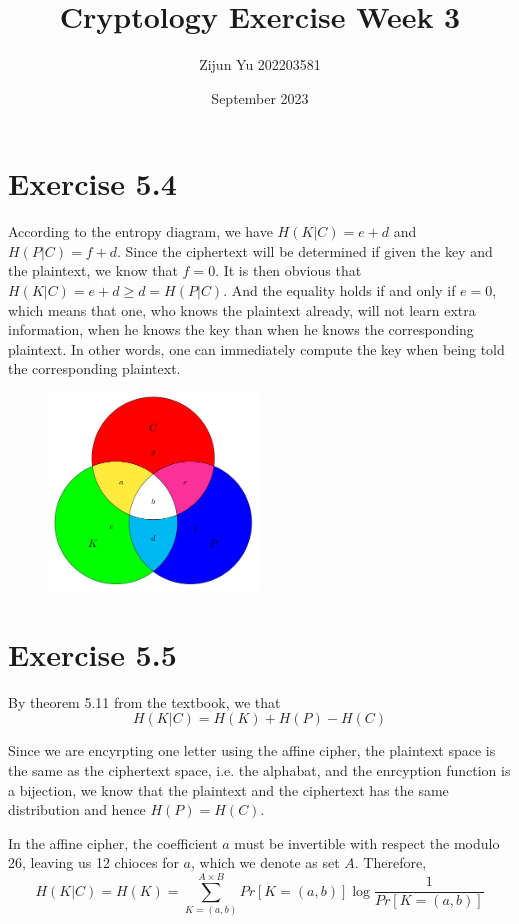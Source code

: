\documentclass{article}
\title{Cryptology Exercise Week 3}
\author{Zijun Yu 202203581}
\date{September 2023}
\begin{document}
\maketitle

\section*{Exercise 5.4}

According to the entropy diagram, we have $H(K|C) = e+d$ and
$H(P|C) = f+d$. Since the ciphertext will be determined if given
the key and the plaintext, we know that $f=0$. It is then
obvious that $H(K|C) = e+d \geq d = H(P|C)$. And the equality
holds if and only if $e=0$, which means that one,
who knows the plaintext already, will not learn
extra information, when he knows the key than when he knows
the corresponding plaintext. In other words, one can immediately
compute the key when being told the corresponding plaintext.

\begin{figure}[h]
    \centering
    \includegraphics[width=0.5\textwidth]{entropy_diagram}
\end{figure}

\section*{Exercise 5.5}

By theorem 5.11 from the textbook, we that
$$
    H(K|C) = H(K) + H(P) - H(C)
$$

Since we are encyrpting one letter using the affine cipher,
the plaintext space is the same as
the ciphertext space, i.e. the alphabat, and the enrcyption
function is a bijection, we know that the plaintext
and the ciphertext has the same distribution and hence
$H(P) = H(C)$.

In the affine cipher, the coefficient $a$ must be invertible
with respect the modulo 26, leaving us 12 chioces for $a$,
which we denote as set $A$.
Therefore,
$$H(K|C) = H(K) = \sum_{K=(a,b)}^{A \times B}  Pr[K=(a,b)] \log \frac{1}{Pr[K=(a,b)]}$$
\end{document}
